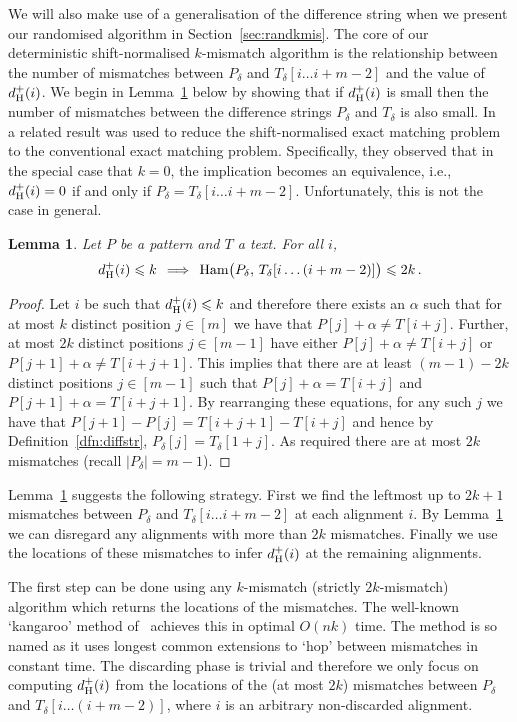 \documentclass[11pt]{article}
\renewcommand{\leq}{\leqslant}
\newcommand{\ham}{\ensuremath{\textup{Ham}}}
\newcommand{\upto}{\ldots}
\newcommand{\DsHam}{\ensuremath{d_\textup{H}^+}}
\newcommand{\dHam}{\DsHam}
\theoremstyle{plain}
\newtheorem{lemma}[theorem]{Lemma}
\theoremstyle{definition}
\begin{document}
We will also make use of a generalisation of the difference string when we present our randomised algorithm in Section~\ref{sec:randkmis}. The core of our deterministic shift-normalised $k$-mismatch algorithm is the relationship between the number of mismatches between $P_\delta$ and $T_{\delta}[i \upto i+m-2]$ and the value of $\dHam(i)$. We begin in Lemma~\ref{lem:TI-up} below by showing that if $\dHam(i)$ is small then the number of mismatches between the difference strings $P_\delta$ and $T_\delta$ is also small. In~\cite{MNU:2005} a related result was used to reduce the shift-normalised exact matching problem to the conventional exact matching problem. Specifically, they observed that in the special case that $k=0$, the implication becomes an equivalence, i.e., $\dHam(i)=0$ if and only if $P_\delta=T_{\delta}[i\upto i+m-2]$. Unfortunately, this is not the case in general.

\begin{lemma}
    \label{lem:TI-up}
    Let $P$ be a pattern and $T$ a text. For all $i$,
\begin{equation*}
       \dHam(i)\leq k \,\implies\, \ham\big(P_\delta,\, T_{\delta}[i\upto (i+m-2)]\big) \leq 2k \,.
    \end{equation*}
\end{lemma}
\begin{proof}
    Let $i$ be such that $\dHam(i)\leq k$ and therefore there exists an $\alpha$ such that for at most $k$ distinct position $j\in [m]$ we have that $P[j]+\alpha \neq T[i+j]$. Further, at most $2k$ distinct positions $j\in [m-1]$ have either $P[j]+\alpha \neq T[i+j]$ or $P[j+1]+\alpha \neq T[i+j+1]$. This implies that there are at least $(m-1)-2k$ distinct positions $j\in [m-1]$ such that $P[j]+\alpha = T[i+j]$ and $P[j+1]+\alpha = T[i+j+1]$. By rearranging these equations, for any such $j$ we have that $P[j+1]-P[j]=T[i+j+1]-T[i+j]$ and hence by Definition~\ref{dfn:diffstr}, $P_\delta[j]=T_\delta[1+j]$. As required there are at most $2k$ mismatches (recall $|P_\delta|=m-1$).
\end{proof}

Lemma~\ref{lem:TI-up} suggests the following strategy. First we find the leftmost up to $2k+1$ mismatches between $P_\delta$ and $T_{\delta}[i\upto i+m-2]$ at each alignment $i$. By Lemma~\ref{lem:TI-up} we can disregard any alignments with more than $2k$ mismatches. Finally we use the locations of these mismatches to infer $\dHam(i)$ at the remaining alignments.

The first step can be done using any $k$-mismatch (strictly $2k$-mismatch) algorithm which returns the locations of the mismatches. The well-known `kangaroo' method of~\cite{LV:1986a} achieves this in optimal $O(nk)$ time. The method is so named as it uses longest common extensions to `hop' between mismatches in constant time. The discarding phase is trivial and therefore we only focus on computing $\dHam(i)$ from the locations of the (at most $2k$) mismatches between $P_\delta$ and $T_{\delta}[i\upto (i+m-2)]$, where $i$ is an arbitrary non-discarded alignment.
\end{document}
